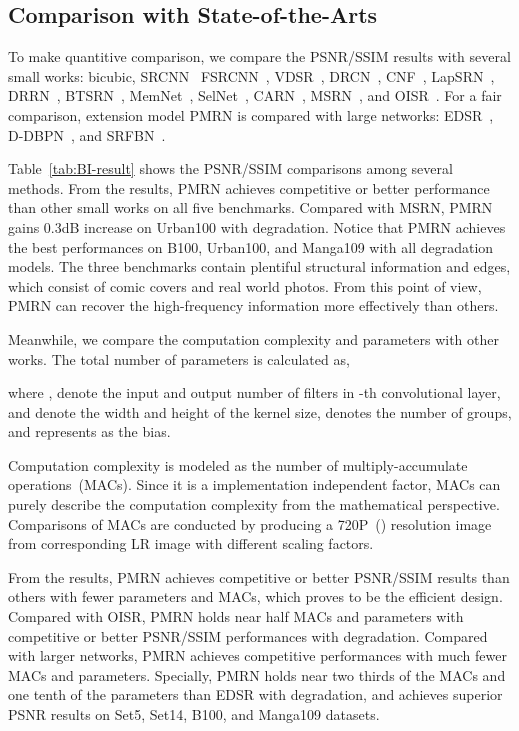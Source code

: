 \documentclass[journal]{IEEEtran}
\begin{document}
\subsection{Comparison with State-of-the-Arts}
To make quantitive comparison, we compare the PSNR/SSIM results with several small works: bicubic, SRCNN~\cite{srcnn} FSRCNN~\cite{fsrcnn}, VDSR~\cite{vdsr}, DRCN~\cite{drcn_ghifary2016deep}, CNF~\cite{cnf_ren2017image}, LapSRN~\cite{lapsrn, ms-lapsrn}, DRRN~\cite{drrn_tai2017image}, BTSRN~\cite{btsrn_fan2017balanced}, MemNet~\cite{memnet}, SelNet~\cite{selnet_choi2017deep}, CARN~\cite{carn}, MSRN~\cite{msrn}, and OISR~\cite{oisr}. For a fair comparison, extension model PMRN is compared with large networks: EDSR~\cite{edsr_lim2017}, D-DBPN~\cite{dbpn_haris2018deep}, and SRFBN~\cite{srfbn}. 

Table~\ref{tab:BI-result} shows the PSNR/SSIM comparisons among several methods. From the results, PMRN achieves competitive or better performance than other small works on all five benchmarks. Compared with MSRN, PMRN gains 0.3dB increase on Urban100 with  degradation. Notice that PMRN achieves the best performances on B100, Urban100, and Manga109 with all degradation models. The three benchmarks contain plentiful structural information and edges, which consist of comic covers and real world photos. From this point of view, PMRN can recover the high-frequency information more effectively than others.

Meanwhile, we compare the computation complexity and parameters with other works. The total number of parameters is calculated as,

where ,  denote the input and output number of filters in -th convolutional layer,  and  denote the width and height of the kernel size,  denotes the number of groups, and  represents as the bias. 

Computation complexity is modeled as the number of multiply-accumulate operations~(MACs). Since it is a implementation independent factor, MACs can purely describe the computation complexity from the mathematical perspective. Comparisons of MACs are conducted by producing a 720P~() resolution image from corresponding LR image with different scaling factors. 

From the results, PMRN achieves competitive or better PSNR/SSIM results than others with fewer parameters and MACs, which proves to be the efficient design. Compared with OISR, PMRN holds near half MACs and parameters with competitive or better PSNR/SSIM performances with  degradation. Compared with larger networks, PMRN achieves competitive performances with much fewer MACs and parameters. Specially, PMRN holds near two thirds of the MACs and one tenth of the parameters than EDSR with  degradation, and achieves superior PSNR results on Set5, Set14, B100, and Manga109 datasets.
\end{document}
